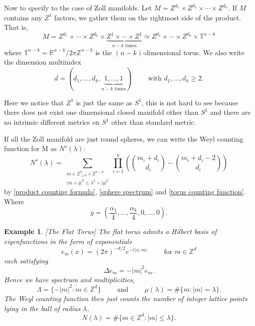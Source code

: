 \documentclass[10pt]{amsart}
\newtheorem{exmp}[theorem]{Example}
\newcommand{\R}{{\mathbb R}}
\newcommand{\1}{\mathbb{1}}
\newcommand{\Z}{{\mathbb Z}}
\newcommand{\T}{{\mathbb T}}
\begin{document}
Now to specify to the case of Zoll manifolds. Let $M = Z^{d_1} \times Z^{d_2} \times \cdots \times Z^{d_n}$. If $M$ contains any $Z^1$ factors, we gather them on the rightmost side of the product. That is,
\[
    M = Z^{d_1} \times \cdots \times Z^{d_k} \times \underbrace{Z^1 \times \cdots \times Z^1}_{\text{$n-k$ times}} \simeq Z^{d_1} \times \cdots \times Z^{d_k} \times \T^{n-k}
\]
where $\T^{n-k} = \R^{n-k}/2\pi \Z^{n-k}$ is the $(n-k)$-dimensional torus. We also write the dimension multiindex
\[
    d = (d_1,\ldots,d_k,\underbrace{1,\ldots,1}_{\text{$n-k$ times}}) \qquad \text{ with } d_1,\ldots, d_k \geq 2.
\]

Here we notice that $Z^1$ is just the same as $S^1$, this is not hard to see because there does not exist one dimensional closed manifold other than $S^1$ and there are no intrinsic different metrics on $S^1$ other than standard metric. 

If all the Zoll manifold are just round spheres, we can write the Weyl counting function for M as $N^s(\lambda)$:
\begin{equation} \label{sphere product counting function}
    N^s(\lambda) = \sum_{\substack{m \in \Z_{\geq 0}^k \times \Z^{n-k} \\ |m + y|^2 \leq \lambda^2 + |y|^2}} \prod_{i = 1}^k \left( \binom{m_i + d_i}{d_i} - \binom{m_i + d_i - 2}{d_i} \right)
\end{equation}
by \eqref{product counting formula}, \eqref{sphere spectrum} and \eqref{torus counting function}. Where
\[
    y = \left( \frac{\alpha_1}{4} , \ldots , \frac{\alpha_k}{4} , 0, \ldots, 0 \right).
\]

\begin{exmp}\label{flat torus}[The Flat Torus]
The flat torus admits a Hilbert basis of eigenfunctions in the form of exponentials
\[
    e_m(x) = (2\pi)^{-d/2} e^{-i\langle x , m \rangle} \qquad \text{ for $m \in \Z^d$}
\]
each satisfying
\[
    \Delta e_m = -|m|^2 e_m.
\]
Hence we have spectrum and multiplicities,
\[
    \Lambda = \{ -|m|^2 : m \in \Z^d \} \qquad \text{ and } \qquad \mu(\lambda) = \#\{ m : |m| = \lambda\}.
\]
The Weyl counting function then just counts the number of integer lattice points lying in the ball of radius $\lambda$,
\begin{equation}\label{torus counting function}
    N(\lambda) = \#\{m \in \Z^d : |m| \leq \lambda\}.
\end{equation}
\end{exmp}
\end{document}
